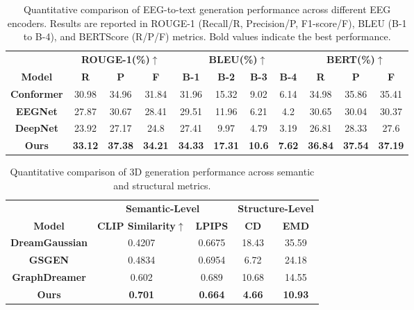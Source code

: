 \documentclass[sigconf]{acmart}
\begin{document}
\begin{table}
\centering
\caption{Quantitative comparison of EEG-to-text generation performance across different EEG encoders. Results are reported in ROUGE-1 (Recall/R, Precision/P, F1-score/F), BLEU (B-1 to B-4), and BERTScore (R/P/F) metrics. Bold values indicate the best performance.}
\label{quetg}
\begin{tabular}{c c c c c c c c c c c}
\toprule
& \multicolumn{3}{c}{\textbf{ROUGE-1(\%)$\uparrow$}} & \multicolumn{4}{c}{\textbf{BLEU(\%)$\uparrow$}} & 
\multicolumn{3}{c}{\textbf{BERT(\%)$\uparrow$}}\\
{\textbf{Model}} & \textbf{R} & \textbf{P} & \textbf{F} & \textbf{B-1} & \textbf{B-2} & \textbf{B-3} & \textbf{B-4} &
\textbf{R} & \textbf{P} & \textbf{F}\\
\midrule
\textbf{Conformer} &30.98 & 34.96 & 31.84 & 31.96 & 15.32 & 9.02 & 6.14 & 34.98 & 35.86 & 35.41 \\
\textbf{EEGNet} & 27.87 & 30.67 & 28.41 & 29.51 & 11.96 & 6.21 & 4.2 & 30.65 & 30.04 & 30.37\\
\textbf{DeepNet} & {23.92} & {27.17} & {24.8} & {27.41} & {9.97} & {4.79} & {3.19} & {26.81} & {28.33} & {27.6}\\
\textbf{Ours} & \textbf{33.12} & \textbf{37.38} & \textbf{34.21} & \textbf{34.33} & \textbf{17.31} & \textbf{10.6} & \textbf{7.62} & \textbf{36.84} & \textbf{37.54} & \textbf{37.19}\\
\bottomrule
\end{tabular}
\end{table}



\begin{table}
\centering
\caption{Quantitative comparison of 3D generation performance across semantic and structural metrics.}
\label{qua3d}
\small 
\setlength{\tabcolsep}{4pt} 
\begin{tabular}{c c c | c c}
\toprule
& \multicolumn{2}{c}{\textbf{Semantic-Level}} & \multicolumn{2}{c}{\textbf{Structure-Level}} \\
{\textbf{Model}} & \textbf{CLIP Similarity$\uparrow$} & \textbf{LPIPS} & \textbf{CD} & \textbf{EMD}\\
\midrule
\textbf{DreamGaussian} & 0.4207 & 0.6675 & 18.43 & 35.59 \\
\textbf{GSGEN} & 0.4834 & 0.6954 & 6.72 & 24.18 \\
\textbf{GraphDreamer} & 0.602 & 0.689 & 10.68 & 14.55 \\
\textbf{Ours} & \textbf{0.701} & \textbf{0.664} & \textbf{4.66} & \textbf{10.93}\\
\bottomrule
\end{tabular}
\end{table}
\end{document}
